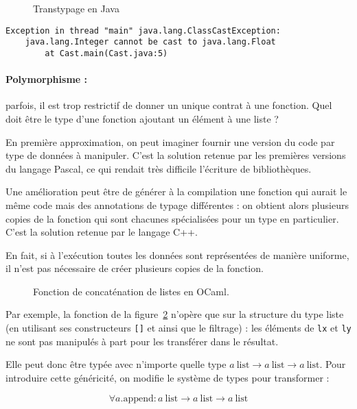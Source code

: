 \begin{figure}
  \caption{Transtypage en Java}
  \label{fig:javacast}
\end{figure}

\begin{Verbatim}
Exception in thread "main" java.lang.ClassCastException:
    java.lang.Integer cannot be cast to java.lang.Float
        at Cast.main(Cast.java:5)
\end{Verbatim}

\paragraph{Polymorphisme :} parfois, il est trop restrictif de donner un unique
contrat à une fonction. Quel doit être le type d'une fonction ajoutant un
élément à une liste ?

En première approximation, on peut imaginer fournir une version du code par type
de données à manipuler. C'est la solution retenue par les premières versions du
langage Pascal, ce qui rendait très difficile l'écriture de
bibliothèques\cite{PascalNoEscape}.

Une amélioration peut être de générer à la compilation une fonction qui aurait
le même code mais des annotations de typage différentes : on obtient alors
plusieurs copies de la fonction qui sont chacunes spécialisées pour un type en
particulier. C'est la solution retenue par le langage C++.

En fait, si à l'exécution toutes les données sont représentées de manière
uniforme, il n'est pas nécessaire de créer plusieurs copies de la fonction.

\begin{figure}
  \caption{Fonction de concaténation de listes en OCaml.}
  \label{fig:listappend}
\end{figure}

Par exemple, la fonction de la figure~\ref{fig:listappend} n'opère que sur la
structure du type liste (en utilisant ses constructeurs \texttt{{[}{]}} et
\listcons ainsi que le filtrage) : les éléments de \texttt{lx} et \texttt{ly} ne
sont pas manipulés à part pour les transférer dans le résultat.

Elle peut donc être typée avec n'importe quelle type 
$a~\textrm{list} → a~\textrm{list} → a~\textrm{list}$. Pour introduire cette
généricité, on modifie le système de types pour transformer :

\[ ∀ a. \textrm{append} :
   a~\textrm{list} → a~\textrm{list} → a~\textrm{list}
\]

